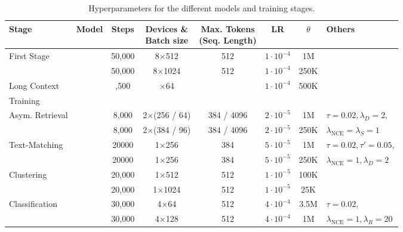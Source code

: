 \documentclass[11pt]{article}
\begin{document}
\begin{table}[H]
\centering
\small
\caption{Hyperparameters for the different models and training stages.}
\label{tab:training_hparams}
\setlength{\tabcolsep}{5pt}
\renewcommand{\arraystretch}{1.15}
\begin{tabular}{llcccccl}
\toprule
Stage & Model & Steps & \makecell{Devices \& \\ Batch size} & \makecell{Max. Tokens \\ (Seq. Length)} & LR & $\theta$ & Others \\
\midrule
\multirow{2}{*}{First Stage} 
  & \JEmbeddingVFiveTextSmallShort{} & 50,000 & 8$\times{}$512 & 512 & $1\cdot{}10^{-4}$ & 1M & \\
  & \JEmbeddingVFiveTextNanoShort{} & 50,000 & 8$\times{}$1024  & 512 & $1\cdot{}10^{-4}$ & 250K &  \\
\midrule
Long Context
& \multirow{2}{*}{\centering\JEmbeddingVFiveTextSmallShort{}} 
& \multirow{2}{*}{\centering 6,500} 
& \multirow{2}{*}{\centering 2$\times{}$64} 
& \multirow{2}{*}{\centering 4096} 
& \multirow{2}{*}{\centering $1\cdot{}10^{-4}$} 
& \multirow{2}{*}{\centering 500K} 
& \multirow{2}{*}{\centering} \\
Training & & & & & & & \\
\midrule
\multirow{2}{*}{Asym. Retrieval} 
  & \JEmbeddingVFiveTextSmallShort{} & 8,000  & 2$\times{}$(256 / 64) & 384 / 4096 & $2\cdot{}10^{-5}$ & 1M & $\tau=0.02,
\lambda_D=2,$\\
  & \JEmbeddingVFiveTextNanoShort{} & 8,000  & 2$\times{}$(384 / 96) & 384 / 4096 & $2\cdot{}10^{-5}$ & 250K & $\lambda_{\text{NCE}}=\lambda_S=1$  \\
\midrule
\multirow{2}{*}{Text-Matching} 
  & \JEmbeddingVFiveTextSmallShort{} & 20000 & 1$\times{}$256 & 384 & $5\cdot{}10^{-5}$ & 1M & $\tau=0.02, \tau'=0.05$, \\
  & \JEmbeddingVFiveTextNanoShort{} & 20000 & 1$\times{}$256  & 384 & $5\cdot{}10^{-5}$ & 250K & $\lambda_{\text{NCE}}=1,\lambda_D=2$ \\
\midrule
\multirow{2}{*}{Clustering} 
  & \JEmbeddingVFiveTextSmallShort{} & 20,000 & 1$\times{}$512 & 512 & $1\cdot{}10^{-5}$ & 100K &  \\
  & \JEmbeddingVFiveTextNanoShort{} & 20,000 & 1$\times{}$1024 & 512 & $1\cdot{}10^{-5}$ & 25K &  \\
\midrule
\multirow{2}{*}{Classification} 
  & \JEmbeddingVFiveTextSmallShort{} & 30,000 & 4$\times{}$64 & 512 & $4\cdot{}10^{-4}$ & 3.5M & $\tau=0.02,$ \\
  & \JEmbeddingVFiveTextNanoShort{} & 30,000 & 4$\times{}$128 & 512 & $4\cdot{}10^{-4}$ & 1M &  $\lambda_{\text{NCE}}=1,\lambda_R=20$\\
\bottomrule
\end{tabular}
\end{table}
\end{document}
